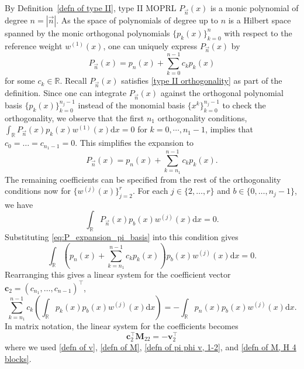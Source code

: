 \documentclass[a4paper,10pt,leqno]{amsart}
\numberwithin{equation}{section}
\theoremstyle{remark}
\newcommand{\dd}{\mathrm{d}}
\newcommand{\R}{\mathbb{R}}
\begin{document}
By Definition~\ref{defn of type II}, type II MOPRL $P_{\vec{n}}(x)$ is a monic polynomial of degree $n=|\vec{n}|$. 
As the space of polynomials of degree up to $n$ is a Hilbert space spanned by the monic orthogonal polynomials $\{ p_k (x) \}_{k=0}^n$ with respect to the reference weight $w^{(1)}(x)$, one can uniquely express $P_{\vec{n}}(x)$ by
\begin{equation}
    P_{\vec{n}}(x) = p_n(x) + \sum_{k=0}^{n-1} c_k p_k(x)
\end{equation}
for some $c_k \in \R$. Recall $P_{\vec{n}}(x)$ satisfies \eqref{type II orthogonality} as part of the definition. 
Since one can integrate $P_{\vec{n}}(x)$ against the orthogonal polynomial basis $\{p_k(x)\}_{k=0}^{n_j-1}$ instead of the monomial basis $\{x^k\}_{k=0}^{n_j-1}$ to check the orthogonality, we observe that the first $n_1$ orthogonality conditions, $\int_\R P_{\vec{n}}(x) p_k(x) w^{(1)}(x) \dd x = 0$ for $k = 0, \cdots, n_1 - 1$, implies that $c_0 = \dots = c_{n_1-1} = 0$.
This simplifies the expansion to
\begin{equation} \label{eq:P_expansion_pi_basis}
    P_{\vec{n}}(x) = p_n(x) + \sum_{k=n_1}^{n-1} c_k p_k(x).
\end{equation}
The remaining coefficients can be specified from the rest of the orthogonality conditions now for $\{w^{(j)}(x)\}_{j=2}^r$.
For each $j \in \{2, \dots, r\}$ and $b \in \{0, \dots, n_j-1\}$, we have
\begin{equation}
\int_{\R} P_{\vec{n}}(x) p_b(x) w^{(j)}(x) \dd x = 0.
\end{equation}
Substituting \eqref{eq:P_expansion_pi_basis} into this condition gives
\begin{equation}
\int_{\R} \left( p_n(x) + \sum_{k=n_1}^{n-1} c_k p_k(x) \right) p_b(x) w^{(j)}(x) \dd x = 0.
\end{equation}
Rearranging this gives a linear system for the coefficient vector $\bm{c}_2 = (c_{n_1}, \dots, c_{n-1})^\top$,
\begin{equation}
\sum_{k=n_1}^{n-1} c_k \left( \int_{\R} p_k(x) p_b(x) w^{(j)}(x) \dd x \right) = - \int_{\R} p_n(x) p_b(x) w^{(j)}(x) \dd x.
\end{equation}
In matrix notation, the linear system for the coefficients becomes 
\begin{equation} \label{cM=-v}
  \bm{c}_2^\top  \bm{M}_{22}=-\bm{v}_2^\top
\end{equation}
where we used \eqref{defn of v}, \eqref{defn of M}, \eqref{defn of pi phi v, 1-2}, and \eqref{defn of M, H 4 blocks}.
\end{document}

